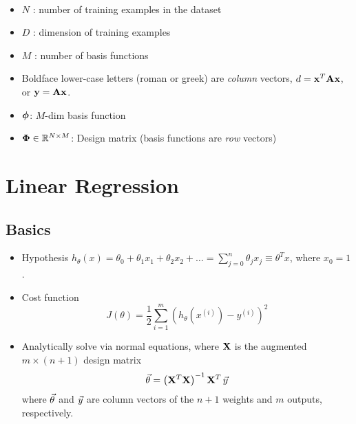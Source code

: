 \documentclass[11pt]{article}
\begin{document}
\paragraph{\cite{BISHOP}}
\begin{itemize}
  \item $N$ : number of training examples in the dataset
  \item $D$ : dimension of training examples
  \item $M$ : number of basis functions
  \item Boldface lower-case letters (roman or greek) are \emph{column} vectors, \eeg
  $d = \mathbf{x}^T \mathbf{A} \mathbf{x}$, or $\mathbf{y} = \mathbf{A} \mathbf{x}$.
  \item $\boldsymbol{\phi}$: $M$-dim basis function
  \item $\boldsymbol{\Phi} \in \mathbb{R}^{N \times M}$: Design matrix (basis functions are
  \emph{row} vectors)
\end{itemize}


\newpage
\section{Linear Regression}
\label{sec:linreg}
\subsection{Basics}
\begin{itemize}
  \item Hypothesis
  $h_\theta(x) = \theta_0 + \theta_1 x_1 + \theta_2 x_2 + \dots = \sum_{j=0}^{n}
  \theta_j x_j \equiv \theta^T x$, where $x_0 = 1$.
  \item Cost function
  \begin{equation}
    J(\theta) = \frac{1}{2} \sum_{i=1}^m \left(h_\theta(x^{(i)}) - y^{(i)}\right)^2
  \end{equation}
  \item Analytically solve via normal equations, where $\mathbf{X}$ is the augmented
  $m \times (n+1)$ design matrix
  \begin{equation}
    \vec{\theta} = \left(\mathbf{X}^T \mathbf{X} \right)^{-1} \mathbf{X}^T \, \vec{y}
  \end{equation}
  where $\vec{\theta}$ and $\vec{y}$ are column vectors of the $n+1$ weights and $m$
  outputs, respectively.
\end{itemize}



\end{document}
